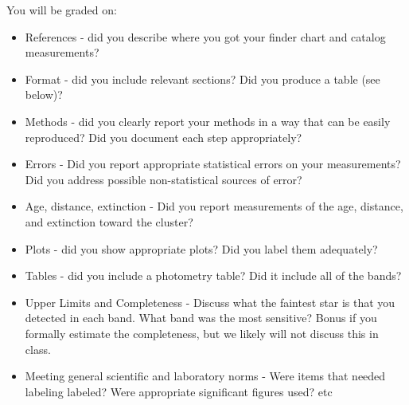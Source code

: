 \documentclass[11pt]{article}
\begin{document}
You will be graded on:
\begin{itemize}
    \item References - did you describe where you got your finder chart and catalog measurements?
    \item Format - did you include relevant sections?  Did you produce a table (see below)?
    \item Methods - did you clearly report your methods in a way that can be easily reproduced?
        Did you document each step appropriately?
    \item Errors - Did you report appropriate statistical errors on your measurements?
        Did you address possible non-statistical sources of error?
    \item Age, distance, extinction - Did you report measurements of the age, distance, and extinction
        toward the cluster?
    \item Plots - did you show appropriate plots?  Did you label them adequately?
    \item Tables - did you include a photometry table?  Did it include all of the bands?
    \item Upper Limits and Completeness - Discuss what the faintest star is that you detected in each
        band.  What band was the most sensitive?  Bonus if you formally estimate the completeness, but
        we likely will not discuss this in class.
    \item Meeting general scientific and laboratory norms - Were items that needed labeling labeled?
        Were appropriate significant figures used? etc
\end{itemize}
\end{document}

